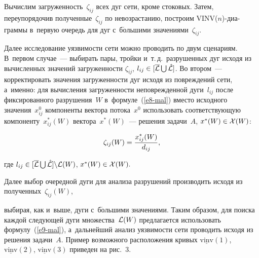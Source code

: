 \begin{multicols}{2}
Вычислим загруженность~$\zeta_{ij}$ всех дуг сети, кроме стоковых.
Затем, переупорядочив полученные~$\zeta_{ij}$ по невозрастанию, построим 
VINV($n$)-диа-\linebreak грам\-мы в~первую очередь для дуг с~б$\acute{\mbox{о}}$льшими 
значени\-ями~$\zeta_{ij}$.

Далее исследование уязвимости сети можно про\-во\-дить по двум сценариям. 
В~первом случае~--- выбирать пары, тройки и~т.\,д.\  
разрушенных дуг исходя из вычисленных значений загруженности $\zeta_{ij}$, 
$l_{ij} \hm\in [\overline {\cal L} \bigcup \hat {\cal L}]$. Во втором~--- 
корректировать значения загруженности дуг исходя из повреждений\linebreak
 сети, 
а~именно: для вычисления загруженности не\-по\-вреж\-ден\-ной дуги~$l_{ij}$ 
после фиксированного разруше\-ния~$W$ в~формуле~(\ref{e8-mal}) 
вместо исходного значения~$x_{ij}^0$ компоненты вектора потока~$x^0$  
использовать соответствующую компоненту~$x_{ij}^*(W)$ вектора~$x^*(W)$~--- 
решения задачи~$A$, $x^*(W) \hm\in 
{\cal X}(W)$:

\vspace*{3pt}

\noindent
\begin{equation}
\zeta_{ij}(W) = \displaystyle\frac{\displaystyle x_{ij}^*(W)\mathstrut}{\displaystyle d_{ij}\mathstrut},
\label{e9-mal}
\end{equation}

\vspace*{-3pt}

\noindent
где $l_{ij} \in 
[\overline {\cal L} \bigcup \hat {\cal L}] \backslash {\cal L}(W)$, $x^*(W) \hm\in 
{\cal X}(W).$



Далее выбор очередной дуги для анализа разрушений производить 
исходя из полученных~$\zeta_{ij}(W)$,\linebreak\vspace*{-12pt}

\columnbreak

\noindent
 выбирая, как и~выше, дуги 
с~б$\acute{\mbox{о}}$льшими значениями. Таким образом, для поиска 
каждой следующей дуги множества~${\cal L}(W)$ предлагается использовать 
формулу~(\ref{e9-mal}), а~дальнейший анализ уязвимости сети проводить 
исходя из решения задачи~$A$.
Пример возможного расположения кривых $\underline {\mathrm{vinv}}(1)$, 
$\underline {\mathrm{vinv}}(2)$, $\underline {\mathrm{vinv}}(3)$ приведен на рис.~3.

\vspace*{-6pt}


\end{multicols}
